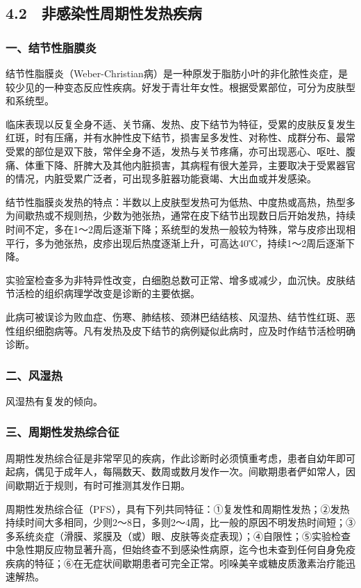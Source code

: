 \protect\hypertarget{text00031.html}{}{}

\subsection{4.2　非感染性周期性发热疾病}

\subsubsection{一、结节性脂膜炎}

结节性脂膜炎（Weber-Christian病）是一种原发于脂肪小叶的非化脓性炎症，是较少见的一种变态反应性疾病。好发于青壮年女性。根据受累部位，可分为皮肤型和系统型。

临床表现以反复全身不适、关节痛、发热、皮下结节为特征，受累的皮肤反复发生红斑，时有压痛，并有水肿性皮下结节，损害呈多发性、对称性、成群分布、最常受累的部位是双下肢，常伴全身不适，发热与关节疼痛，亦可出现恶心、呕吐、腹痛、体重下降、肝脾大及其他内脏损害，其病程有很大差异，主要取决于受累器官的情况，内脏受累广泛者，可出现多脏器功能衰竭、大出血或并发感染。

结节性脂膜炎发热的特点：半数以上皮肤型发热可为低热、中度热或高热，热型多为间歇热或不规则热，少数为弛张热，通常在皮下结节出现数日后开始发热，持续时间不定，多在1～2周后逐渐下降；系统型的发热一般较为特殊，常与皮疹出现相平行，多为弛张热，皮疹出现后热度逐渐上升，可高达40℃，持续1～2周后逐渐下降。

实验室检查多为非特异性改变，白细胞总数可正常、增多或减少，血沉快。皮肤结节活检的组织病理学改变是诊断的主要依据。

此病可被误诊为败血症、伤寒、肺结核、颈淋巴结结核、风湿热、结节性红斑、恶性组织细胞病等。凡有发热及皮下结节的病例疑似此病时，应及时作结节活检明确诊断。

\subsubsection{二、风湿热}

风湿热有复发的倾向。

\subsubsection{三、周期性发热综合征}

周期性发热综合征是非常罕见的疾病，作此诊断时必须慎重考虑，患者自幼年即可起病，偶见于成年人，每隔数天、数周或数月发作一次。间歇期患者俨如常人，因间歇期近于规则，有时可推测其发作日期。

周期性发热综合征（PFS），具有下列共同特征：①复发性和周期性发热；②发热持续时间大多相同，少则2～8日，多则2～4周，比一般的原因不明发热时间短；③多系统炎症（滑膜、浆膜及（或）眼、皮肤等炎症表现）；④自限性；⑤实验检查中急性期反应物显著升高，但始终查不到感染性病原，迄今也未查到任何自身免疫疾病的特征；⑥在无症状间歇期患者可完全正常。吲哚美辛或糖皮质激素治疗能迅速解热。

